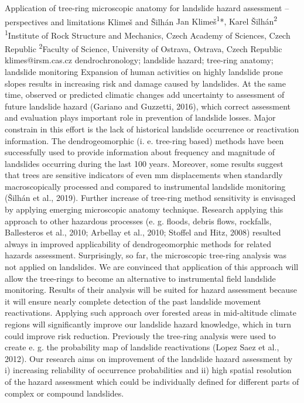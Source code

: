 \abstract
{Application of tree-ring microscopic anatomy for landslide hazard assessment – perspectives and limitations} 
{Klimeš and Šilhán} 
{Jan Klimeš\textsuperscript{1}*, Karel Šilhán\textsuperscript{2}} 
{\POtag} 
{
\textsuperscript{1}Institute of Rock Structure and Mechanics, Czech Academy of Sciences, Czech Republic
\textsuperscript{2}Faculty of Science, University of Ostrava, Ostrava, Czech Republic
}
{klimes@irsm.cas.cz}  %
{dendrochronology; landslide hazard; tree-ring anatomy; landslide monitoring}
{Expansion of human activities on highly landslide prone slopes results in increasing risk and damage caused by landslides. At the same time, observed or predicted climatic changes add uncertainty to assessment of future landslide hazard (Gariano and Guzzetti, 2016), which correct assessment and evaluation plays important role in prevention of landslide losses. Major constrain in this effort is the lack of historical landslide occurrence or reactivation information. The dendrogeomorphic (i. e. tree-ring based) methods have been successfully used to provide information about frequency and magnitude of landslides occurring during the last 100 years. Moreover, some results suggest that trees are sensitive indicators of even mm displacements when standardly macroscopically processed and compared to instrumental landslide monitoring (Šilhán et al., 2019). Further increase of tree-ring method sensitivity is envisaged by applying emerging microscopic anatomy technique. Research applying this approach to other hazardous processes (e. g. floods, debris flows, rockfalls, Ballesteros et al., 2010; Arbellay et al., 2010; Stoffel and Hitz, 2008) resulted always in improved applicability of dendrogeomorphic methods for related hazards assessment. Surprisingly, so far, the microscopic tree-ring analysis was not applied on landslides. We are convinced that application of this approach will allow the tree-rings to become an alternative to instrumental field landslide monitoring. Results of their analysis will be suited for hazard assessment because it will ensure nearly complete detection of the past landslide movement reactivations. Applying such approach over forested areas in mid-altitude climate regions will significantly improve our landslide hazard knowledge, which in turn could improve risk reduction. 
Previously the tree-ring analysis were used to create e. g. the probability map of landslide reactivations (Lopez Saez et al., 2012). Our research aims on improvement of the landslide hazard assessment by i) increasing reliability of occurrence probabilities and ii) high spatial resolution of the hazard assessment which could be individually defined for different parts of complex or compound landslides. 
}
